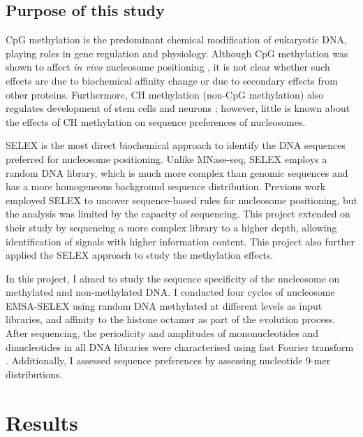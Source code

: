 \documentclass[a4paper, numbers=noenddot]{scrbook}
\begin{document}
\subsection{Purpose of this study}
\label{ssec:emsaselex_intro_why}

CpG methylation is the predominant chemical modification of eukaryotic DNA, playing roles in gene regulation and physiology. Although CpG methylation was shown to affect \emph{in vivo} nucleosome positioning \citep{kelly_genome-wide_2012}, it is not clear whether such effects are due to biochemical affinity change or due to secondary effects from other proteins.  Furthermore, CH methylation (non-CpG methylation) also regulates development of stem cells and neurons \citep{guo_distribution_2014}; however, little is known about the effects of CH methylation on sequence preferences of nucleosomes.

SELEX is the most direct biochemical approach to identify the DNA sequences preferred for nucleosome positioning.  Unlike MNase-seq, SELEX employs a random DNA library, which is much more complex than genomic sequences and has a more homogeneous background sequence distribution.  Previous work \citep{lowary_new_1998} employed SELEX to uncover sequence-based rules for nucleosome positioning, but the analysis was limited by the capacity of sequencing.  This project extended on their study by sequencing a more complex library to a higher depth, allowing identification of signals with higher information content.  This project also further applied the SELEX approach to study the methylation effects.

In this project, I aimed to study the sequence specificity of the nucleosome on methylated and non-methylated DNA.  I conducted four cycles of nucleosome EMSA-SELEX using random DNA methylated at different levels as input libraries, and affinity to the histone octamer as part of the evolution process.  After sequencing, the periodicity and amplitudes of mononucleotides and dinucleotides in all DNA libraries were characterised using fast Fourier transform \citep{lowary_new_1998, zhu_interaction_2018}.  Additionally, I assessed sequence preferences by assessing nucleotide 9-mer distributions.

\section{Results}
\label{sec:emsaselex_results}
\end{document}
